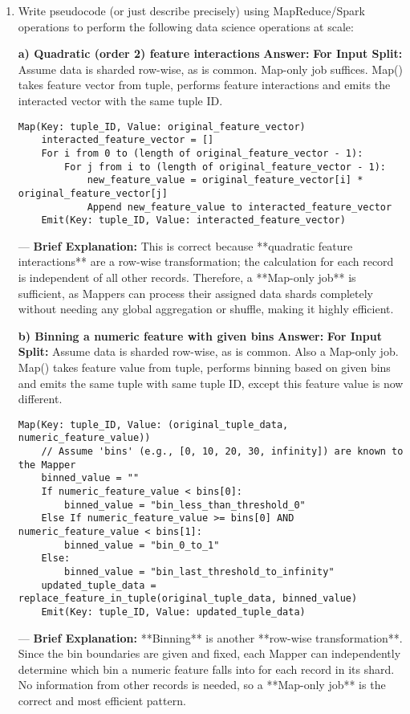 \documentclass{article}
\begin{document}
\begin{enumerate}[label=\textbf{Question \arabic*.}]
---

\item Write pseudocode (or just describe precisely) using MapReduce/Spark operations to perform the following data science operations at scale:

  \textbf{a) Quadratic (order 2) feature interactions}
    \textbf{Answer:}
    \textbf{For Input Split:} Assume data is sharded row-wise, as is common.
    Map-only job suffices. Map() takes feature vector from tuple, performs feature interactions and emits the interacted vector with the same tuple ID.
    \begin{lstlisting}
Map(Key: tuple_ID, Value: original_feature_vector)
    interacted_feature_vector = []
    For i from 0 to (length of original_feature_vector - 1):
        For j from i to (length of original_feature_vector - 1):
            new_feature_value = original_feature_vector[i] * original_feature_vector[j]
            Append new_feature_value to interacted_feature_vector
    Emit(Key: tuple_ID, Value: interacted_feature_vector)
    \end{lstlisting}
    ---
    \textbf{Brief Explanation:} This is correct because **quadratic feature interactions** are a row-wise transformation; the calculation for each record is independent of all other records. Therefore, a **Map-only job** is sufficient, as Mappers can process their assigned data shards completely without needing any global aggregation or shuffle, making it highly efficient.

  \textbf{b) Binning a numeric feature with given bins}
    \textbf{Answer:}
    \textbf{For Input Split:} Assume data is sharded row-wise, as is common.
    Also a Map-only job. Map() takes feature value from tuple, performs binning based on given bins and emits the same tuple with same tuple ID, except this feature value is now different.
    \begin{lstlisting}
Map(Key: tuple_ID, Value: (original_tuple_data, numeric_feature_value))
    // Assume 'bins' (e.g., [0, 10, 20, 30, infinity]) are known to the Mapper
    binned_value = ""
    If numeric_feature_value < bins[0]:
        binned_value = "bin_less_than_threshold_0"
    Else If numeric_feature_value >= bins[0] AND numeric_feature_value < bins[1]:
        binned_value = "bin_0_to_1"
    Else:
        binned_value = "bin_last_threshold_to_infinity"
    updated_tuple_data = replace_feature_in_tuple(original_tuple_data, binned_value)
    Emit(Key: tuple_ID, Value: updated_tuple_data)
    \end{lstlisting}
    ---
    \textbf{Brief Explanation:} **Binning** is another **row-wise transformation**. Since the bin boundaries are given and fixed, each Mapper can independently determine which bin a numeric feature falls into for each record in its shard. No information from other records is needed, so a **Map-only job** is the correct and most efficient pattern.


\end{enumerate}
\end{document}
